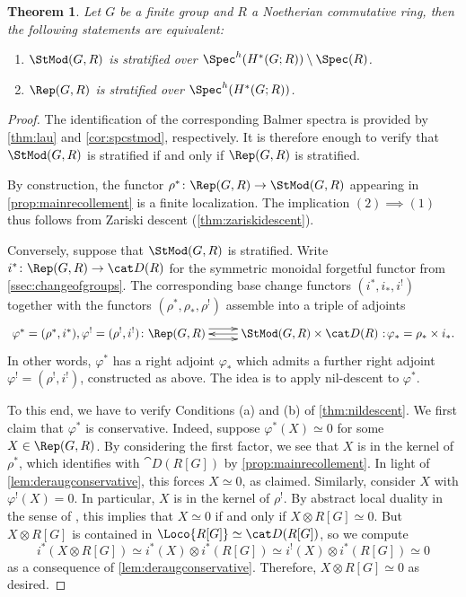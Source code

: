 \documentclass{amsart}%
\numberwithin{equation}{section}%
\newtheorem{Thm}[equation]{Theorem}
\theoremstyle{remark}
\newcommand\noloc{%
  \nobreak
  \mspace{6mu plus 1mu}
  {:}
  \nonscript\mkern-\thinmuskip
  \mathpunct{}
  \mspace{2mu}
}
\newcounter{enum-resume-hack}
\begin{document}
\begin{Thm}\label{thm:stratrepiffstmod}
Let $G$ be a finite group and $R$ a Noetherian commutative ring, then the following statements are equivalent:
    \begin{enumerate}
        \item[(1)] $\StMod(G,R)$ is stratified over $\Spec^h(H^*(G;R))\setminus\Spec(R)$.
        \item[(2)] $\Rep(G,R)$ is stratified over $\Spec^h(H^*(G;R))$.
    \end{enumerate}
\end{Thm}
\begin{proof}
The identification of the corresponding Balmer spectra is provided by \cref{thm:lau} and \cref{cor:spcstmod}, respectively. It is therefore enough to verify that $\StMod(G,R)$ is stratified if and only if $\Rep(G,R)$ is stratified.

By construction, the functor $\rho^*\colon \Rep(G,R) \to \StMod(G,R)$ appearing in \cref{prop:mainrecollement} is a finite localization. The implication $(2) \implies (1)$ thus follows from Zariski descent (\cref{thm:zariskidescent}). 

Conversely, suppose that $\StMod(G,R)$ is stratified. Write $i^*\colon \Rep(G,R) \to \cat D(R)$ for the symmetric monoidal forgetful functor from \cref{ssec:changeofgroups}. The corresponding base change functors $(i^*,i_*,i^!)$ together with the functors $(\rho^*,\rho_*,\rho^!)$ assemble into a triple of adjoints
\[
\xymatrix{\varphi^*=(\rho^*,i^*), \varphi^!=(\rho^!,i^!)\colon\Rep(G,R) \ar@<1ex>[r] \ar@<-1ex>[r] & \StMod(G,R) \times \cat D(R) \ar[l] \noloc \varphi_* = \rho_*\times i_*.}
\]
In other words, $\varphi^*$ has a right adjoint $\varphi_*$ which admits a further right adjoint $\varphi^! = (\rho^!,i^!)$, constructed as above. The idea is to apply nil-descent  to $\varphi^*$. 

To this end, we have to verify Conditions (a) and (b) of \cref{thm:nildescent}. We first claim that $\varphi^*$ is conservative. Indeed, suppose $\varphi^*(X) \simeq 0$ for some $X \in \Rep(G,R)$. By considering the first factor, we see that $X$ is in the kernel of $\rho^*$, which identifies with $\cat D(R[G])$ by \cref{prop:mainrecollement}. In light of \cref{lem:deraugconservative}, this forces $X \simeq 0$, as claimed. Similarly, consider $X$ with $\varphi^!(X)=0$. In particular, $X$ is in the kernel of $\rho^!$. By abstract local duality in the sense of \cite[Thm.~2.21]{bhv1}, this implies that $X \simeq 0$ if and only if $X \otimes R[G] \simeq 0$. But $X \otimes R[G]$ is contained in $\Loco{R[G]} \simeq \cat D(R[G])$, so we compute
\[
i^*(X \otimes R[G]) \simeq i^*(X) \otimes i^*(R[G]) \simeq i^!(X) \otimes i^*(R[G]) \simeq 0
\]
as a consequence of \cref{lem:deraugconservative}. Therefore, $X \otimes R[G] \simeq 0$ as desired.


\end{proof}
\end{document}
